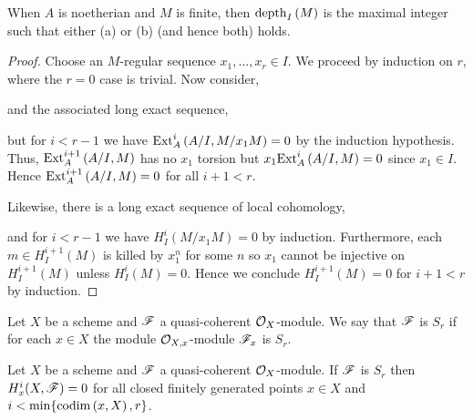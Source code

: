 \documentclass[12pt]{article}
\begin{document}
\begin{rmk}
When $A$ is noetherian and $M$ is finite, then $\mathrm{depth}_{I} \left( M \right)$ is the maximal integer such that either (a) or (b) (and hence both) holds.  
\end{rmk}

\begin{proof}
Choose an $M$-regular sequence $x_1, \dots, x_r \in I$. We proceed by induction on $r$, where the $r = 0$ case is trivial. Now consider,
\begin{center}
\end{center}
and the associated long exact sequence,
\begin{center}
\end{center}
but for $i < r-1$ we have $\mathrm{Ext}^{i}_{A} \left( A/I, M/x_1 M \right) = 0$ by the induction hypothesis. Thus, $\mathrm{Ext}^{i+1}_{A} \left( A/I, M \right)$ has no $x_1$ torsion but $x_1 \mathrm{Ext}^{i}_{A} \left( A/I, M \right) = 0$ since $x_1 \in I$. Hence $\mathrm{Ext}^{i+1}_{A} \left( A/I, M \right) = 0$ for all $i + 1 < r$. 
\par
Likewise, there is a long exact sequence of local cohomology,
\begin{center}
\end{center}
and for $i < r-1$ we have $H^i_I(M/x_1M) = 0$ by induction. Furthermore, each $m \in H^{i+1}_I(M)$ is killed by $x_1^n$ for some $n$ so $x_1$ cannot be injective on $H^{i+1}_I(M)$ unless $H^i_I(M) = 0$. Hence we conclude $H^{i+1}_I(M) = 0$ for $i + 1 < r$ by induction.
\end{proof}

\begin{defn}
Let $X$ be a scheme and $\mathscr{F}$ a quasi-coherent $\mathcal{O}_{X}$-module. We say that $\mathscr{F}$ is $S_r$ if for each $x \in X$ the module $\mathcal{O}_{X, x}$-module $\mathscr{F}_x$ is $S_r$.
\end{defn}

\begin{prop}
Let $X$ be a scheme and $\mathscr{F}$ a quasi-coherent $\mathcal{O}_{X}$-module. If $\mathscr{F}$ is $S_r$ then $H^i_x(X, \mathscr{F}) = 0$ for all closed finitely generated points $x \in X$ and $i < \min\{ \mathrm{codim}\left( x, X \right), r\}$.
\end{prop}
\end{document}
